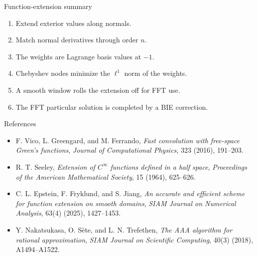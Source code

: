 \documentclass[aspectratio=169,11pt]{beamer}
\begin{document}
\begin{frame}{Function-extension summary}
\small
\begin{enumerate}
  \item Extend exterior values along normals.
  \item Match normal derivatives through order $n$.
  \item The weights are Lagrange basis values at $-1$.
  \item Chebyshev nodes minimize the $\ell^1$ norm of the weights.
  \item A smooth window rolls the extension off for FFT use.
  \item The FFT particular solution is completed by a BIE correction.
\end{enumerate}
\end{frame}

\begin{frame}{References}
\scriptsize
\begin{itemize}
  \item F. Vico, L. Greengard, and M. Ferrando, \emph{Fast convolution with free-space Green's functions}, \emph{Journal of Computational Physics}, 323 (2016), 191--203.
  \item R. T. Seeley, \emph{Extension of $C^\infty$ functions defined in a half space}, \emph{Proceedings of the American Mathematical Society}, 15 (1964), 625--626.
  \item C. L. Epstein, F. Fryklund, and S. Jiang, \emph{An accurate and efficient scheme for function extension on smooth domains}, \emph{SIAM Journal on Numerical Analysis}, 63(4) (2025), 1427--1453.
  \item Y. Nakatsukasa, O. S\`ete, and L. N. Trefethen, \emph{The AAA algorithm for rational approximation}, \emph{SIAM Journal on Scientific Computing}, 40(3) (2018), A1494--A1522.
\end{itemize}
\end{frame}
\end{document}
